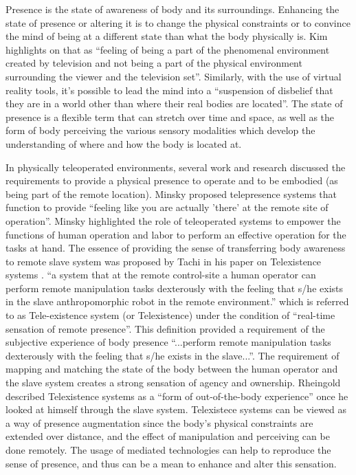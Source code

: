Presence is the state of awareness of body and its surroundings. Enhancing the state of presence or altering it is to change the physical constraints or to convince the mind of being at a different state than what the body physically is. Kim \cite{kim1996effects} highlights on that as ``feeling of being a part of the phenomenal environment created by television and not being a part of the physical environment surrounding the viewer and the television set''. Similarly, with the use of virtual reality tools, it's possible to lead the mind into a ``suspension of disbelief that they are in a world other than where their real bodies are located''\cite{slater1993representations}. The state of presence is a flexible term that can stretch over time and space, as well as the form of body perceiving the various sensory modalities which develop the understanding of where and how the body is located at. 

In physically teleoperated environments, several work and research discussed the requirements to provide a physical presence to operate and to be embodied (as being part of the remote location). Minsky \cite{minsky1980telepresence} proposed telepresence systems that function to provide ``feeling like you are actually 'there' at the remote site of operation''. Minsky highlighted the role of teleoperated systems to empower the functions of human operation and labor to perform an effective operation for the tasks at hand. The essence of providing the sense of transferring body awareness to remote slave system was proposed by Tachi in his paper on Telexistence systems  \cite{tachi1985tele}.  ``a system that at the remote control-site a human operator can perform remote manipulation tasks dexterously with the feeling that s/he exists in the slave anthropomorphic robot in the remote environment.'' which is referred to as Tele-existence system (or Telexistence) under the condition of  ``real-time sensation of remote presence''. This definition provided a requirement of the subjective experience of body presence ``...perform remote manipulation tasks dexterously with the feeling that s/he exists in the slave...''. The requirement of mapping and matching the state of the body between the human operator and the slave system creates a strong sensation of agency and ownership. Rheingold \cite{rheingold1991virtual} described Telexistence systems as a ``form of out-of-the-body experience'' once he looked at himself through the slave system. Telexistece systems can be viewed as a way of presence augmentation since the body's physical constraints are extended over distance, and the effect of manipulation and perceiving can be done remotely. The usage of mediated technologies can help to reproduce the sense of presence, and thus can be a mean to enhance and alter this sensation.

